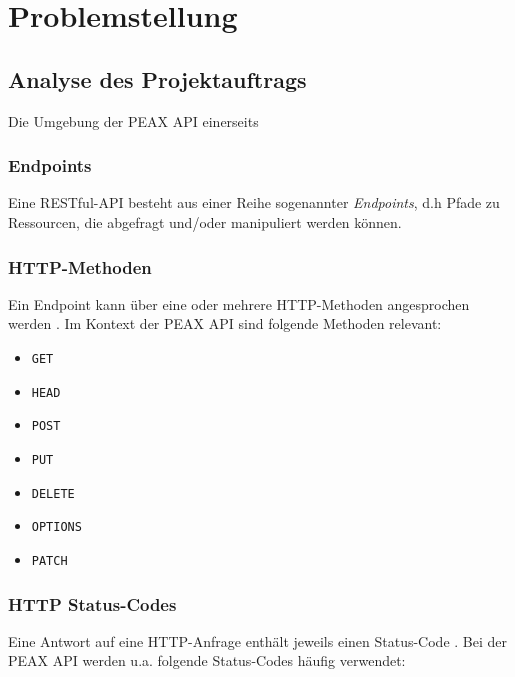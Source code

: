 \section{Problemstellung}

\subsection{Analyse des Projektauftrags}

Die Umgebung der PEAX API einerseits

\subsubsection{Endpoints}

Eine RESTful-API besteht aus einer Reihe sogenannter \textit{Endpoints}, d.h Pfade zu Ressourcen, die abgefragt und/oder manipuliert werden können.

\subsubsection{HTTP-Methoden}

Ein Endpoint kann über eine oder mehrere HTTP-Methoden angesprochen werden \cite[Abschnitt 4.3]{RFC7231}. Im Kontext der PEAX API sind folgende Methoden relevant:

\begin{itemize}
	\item \texttt{GET}
	\item \texttt{HEAD}
	\item \texttt{POST}
	\item \texttt{PUT}
	\item \texttt{DELETE}
	\item \texttt{OPTIONS}
	\item \texttt{PATCH} \cite{RFC5789}
\end{itemize}

\subsubsection{HTTP Status-Codes}

Eine Antwort auf eine HTTP-Anfrage enthält jeweils einen Status-Code \cite[Abschnitt 6]{RFC7231}. Bei der PEAX API werden u.a. folgende Status-Codes häufig verwendet:

